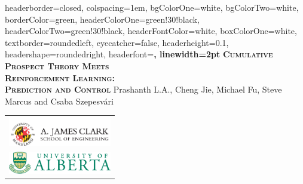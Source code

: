 \documentclass[portrait,a0paper,fontscale=0.285]{baposter} %
\begin{document}
\begin{poster}
{
headerborder=closed, %
colspacing=1em, %
bgColorOne=white, %
bgColorTwo=white, %
borderColor=green, %
headerColorOne=green!30!black, %
headerColorTwo=green!30!black, %
headerFontColor=white, %
boxColorOne=white, %
textborder=roundedleft, %
eyecatcher=false, %
headerheight=0.1\textheight, %
headershape=roundedright, %
headerfont=\Large\bf\textsc, %
linewidth=2pt %
}
%
{}
{\vspace{1ex}\bf\textsc{Cumulative Prospect Theory Meets \\[0.5ex]Reinforcement Learning:\\[0.5ex] Prediction and Control}\vspace{0.5em}} %
{ Prashanth L.A., Cheng Jie, Michael Fu, Steve Marcus and Csaba Szepesv\'ari } %
{
\begin{tabular}{c}
\includegraphics[width=4.5cm]{fig/clark.png} \\
\includegraphics[width=4.5cm]{fig/u-of-alberta-logo} 
\end{tabular}
} %




\end{poster}
\end{document}
